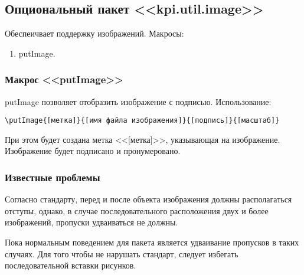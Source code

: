 \subsection{Опциональный пакет <<kpi.util.image>>}
Обеспеичвает поддержку изображений.
Макросы:
\begin{enumerate}
\item putImage.
\end{enumerate}
\subsubsection{Макрос <<putImage>>}
putImage позволяет отобразить изображение с подписью.
Использование:{\small
\begin{verbatim}
\putImage{[метка]}{[имя файла изображения]}{[подпись]}{[масштаб]}
\end{verbatim}}
\normalsize
При этом будет создана метка <<[метка]>>, указывающая на изображение. Изображение будет подписано и пронумеровано.

\subsubsection{Известные проблемы}
Согласно стандарту, перед и после объекта изображения должны располагаться отступы, однако, в случае последовательного расположения двух и более изображений, пропуски удваиваться не должны.\par
Пока нормальным поведением для пакета является удваивание пропусков в таких случаях. Для того чтобы не нарушать стандарт, следует избегать последовательной вставки рисунков.